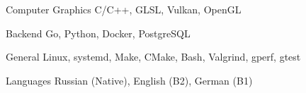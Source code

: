 

\begin{cvskills}

  \cvskill
    {Computer Graphics} %
    {C/C++, GLSL, Vulkan, OpenGL} %

  \cvskill
    {Backend} %
    {Go, Python, Docker, PostgreSQL} %

  \cvskill
    {General} %
    {Linux, systemd, Make, CMake, Bash, Valgrind, gperf, gtest} %

  \cvskill
    {Languages} %
    {Russian (Native), English (B2), German (B1)} %

\end{cvskills}
